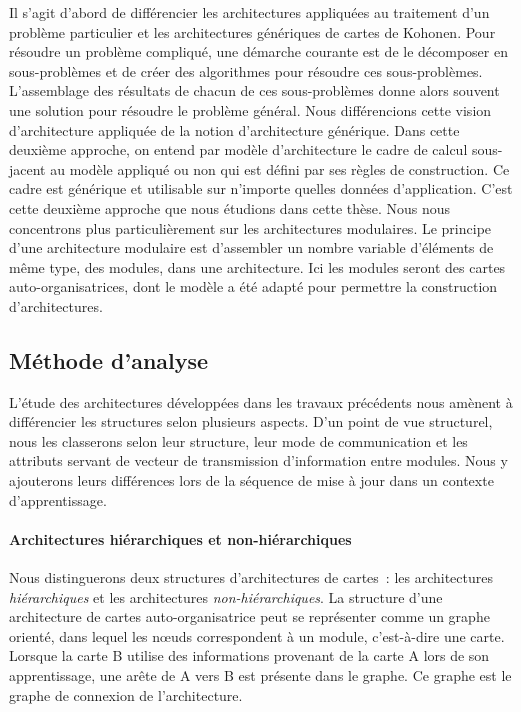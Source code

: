 \documentclass[../main]{subfiles}
\begin{document}
Il s'agit d'abord de différencier les architectures appliquées au traitement d'un problème particulier et les architectures génériques de cartes de Kohonen.
Pour résoudre un problème compliqué, une démarche courante est de le décomposer en sous-problèmes et de créer des algorithmes pour résoudre ces sous-problèmes. L'assemblage des résultats de chacun de ces sous-problèmes donne alors souvent une solution pour résoudre le problème général.
Nous différencions cette vision d'architecture appliquée de la notion d'architecture générique. 
Dans cette deuxième approche, on entend par modèle d'architecture le cadre de calcul sous-jacent au modèle appliqué ou non qui est défini par ses règles de construction. Ce cadre est générique et utilisable sur n'importe quelles données d'application. C'est cette deuxième approche que nous étudions dans cette thèse.
Nous nous concentrons plus particulièrement sur les architectures modulaires. 
Le principe d'une architecture modulaire est d'assembler un nombre variable d'éléments de même type, des modules, dans une architecture. Ici les modules seront des cartes auto-organisatrices, dont le modèle a été adapté pour permettre la construction d'architectures.

\subsection{Méthode d'analyse}

L'étude des architectures développées dans les travaux précédents nous amènent à différencier les structures selon plusieurs aspects. D'un point de vue structurel, nous les classerons selon leur structure, leur mode de communication et les attributs servant de vecteur de transmission d'information entre modules. Nous y ajouterons leurs différences lors de la séquence de mise à jour dans un contexte d'apprentissage.


\paragraph{Architectures hiérarchiques et non-hiérarchiques}

Nous distinguerons deux structures d'architectures de cartes~: les architectures \emph{hiérarchiques} et  les architectures \emph{non-hiérarchiques}.
La structure d'une architecture de cartes auto-organisatrice peut se représenter comme un graphe orienté, dans lequel les n\oe{}uds correspondent à un module, c'est-à-dire une carte. Lorsque la carte B utilise des informations provenant de la carte A lors de son apprentissage, une arête de A vers B est présente dans le graphe. Ce graphe est le graphe de connexion de l'architecture.
\end{document}
